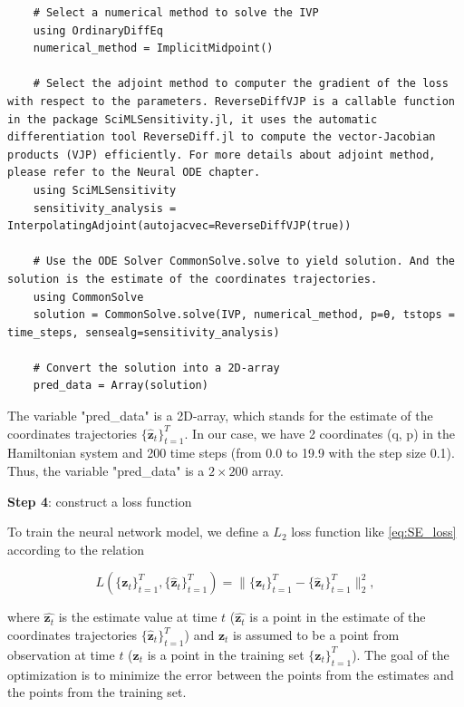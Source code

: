 \documentclass[
	parskip, 			   %
	twoside, 			   %
	DIV=14, 			   %
	BCOR=15.0mm, 		   %
	headsepline, 		   %
	open=right, 		   %
	captions=tableheading, %
	bibliography=totoc,    %
	numbers=noenddot       %
]{scrreprt}
\begin{document}
\begin{verbatim}
    # Select a numerical method to solve the IVP
    using OrdinaryDiffEq
    numerical_method = ImplicitMidpoint()
    
    # Select the adjoint method to computer the gradient of the loss with respect to the parameters. ReverseDiffVJP is a callable function in the package SciMLSensitivity.jl, it uses the automatic differentiation tool ReverseDiff.jl to compute the vector-Jacobian products (VJP) efficiently. For more details about adjoint method, please refer to the Neural ODE chapter.
    using SciMLSensitivity
    sensitivity_analysis = InterpolatingAdjoint(autojacvec=ReverseDiffVJP(true))
    
    # Use the ODE Solver CommonSolve.solve to yield solution. And the solution is the estimate of the coordinates trajectories.
    using CommonSolve
    solution = CommonSolve.solve(IVP, numerical_method, p=θ, tstops = time_steps, sensealg=sensitivity_analysis)
    
    # Convert the solution into a 2D-array
    pred_data = Array(solution)
\end{verbatim}

The variable "pred\_data" is a 2D-array, which stands for the estimate of the coordinates trajectories $\{ \mathbf{\hat{z}}_{t} \}_{t=1}^{T}$. In our case, we have 2 coordinates (q, p) in the Hamiltonian system and 200 time steps (from 0.0 to 19.9 with the step size 0.1). Thus, the variable "pred\_data" is a $2 \times 200$ array.

\textbf{Step 4}: construct a loss function

To train the neural network model, we define a $L_{2}$ loss function like \ref{eq:SE_loss} according to the relation

\begin{equation}
    \label{eq:loss_O-NET}
     L(\{ \mathbf{z}_{t} \}_{t=1}^{T}, \{ \mathbf{\hat{z}}_{t} \}_{t=1}^{T}) = \lVert \{ \mathbf{z}_{t} \}_{t=1}^{T} - \{ \mathbf{\hat{z}}_{t} \}_{t=1}^{T} \rVert_{2}^{2},
\end{equation}

where $\hat{\mathbf{z}_{t}}$ is the estimate value at time $t$ ($\hat{\mathbf{z}_{t}}$ is a point in the estimate of the coordinates trajectories $\{ \mathbf{\hat{z}}_{t} \}_{t=1}^{T}$) and $\mathbf{z}_{t}$ is assumed to be a point from observation at time $t$ (${\mathbf{z}_{t}}$ is a point in the training set $\{ \mathbf{z}_{t} \}_{t=1}^{T}$). The goal of the optimization is to minimize the error between the points from the estimates and the points from the training set.
\end{document}
